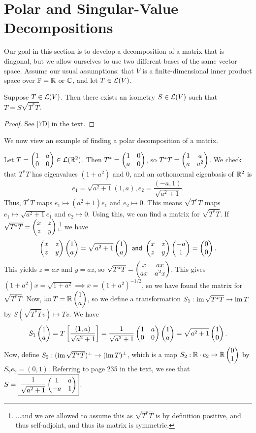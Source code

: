 \documentclass{article}
\newcommand{\vect}[2]{\begin{pmatrix} #1 \\ #2\end{pmatrix}}
\begin{document}
\section{Polar and Singular-Value Decompositions}
Our goal in this section is to develop a decomposition of a matrix that is diagonal, but we allow ourselves to use two different bases of the same vector space. Assume our usual assumptions: that $V$ is a finite-dimensional inner product space over $\mathbb F = \mathbb R$ or $\mathbb C$, and let $T\in\mathcal L(V)$.
\begin{theorem}
Suppose $T\in\mathcal L(V)$. Then there exists an isometry $S\in\mathcal L(V)$ such that $T = S\sqrt{T^*T}$.
\end{theorem}
\begin{proof}
See [7D] in the text.
\end{proof}
We now view an example of finding a polar decomposition of a matrix. \newpage
\begin{example}
Let $T = \begin{pmatrix}1 & a \\ 0 & 0 \end{pmatrix} \in \mathcal L(\mathbb R^2)$. Then $T^* = \begin{pmatrix}1 & 0 \\ a & 0 \end{pmatrix}$, so $T^*T = \begin{pmatrix}1 & a \\ a & a^2 \end{pmatrix}$. We check that $T^*T$ has eigenvalues $(1+a^2)$ and $0$, and an orthonormal eigenbasis of $\mathbb R^2$ is
$$e_1 = \sqrt{a^2+1}(1, a), e_2 = \frac{(-a, 1)}{\sqrt{a^2+1}}.$$
Thus, $T^*T$ maps $e_1 \mapsto (a^2+1)e_1$ and $e_2 \mapsto 0$. This means $\sqrt{T^*T}$ maps $e_1 \mapsto \sqrt{a^2+1}e_1$ and $e_2\mapsto 0$. Using this, we can find a matrix for $\sqrt{T^*T}$. If $\sqrt{T^*T} = \begin{pmatrix}x & z \\ z & y \end{pmatrix}$,\footnote{...and we are allowed to assume this as $\sqrt{T^*T}$ is by definition positive, and thus self-adjoint, and thus its matrix is symmetric.} we have
$$\matfour xzzy\vect 1a = \sqrt{a^2+1}\vect 1a \textsf{ and } \matfour xzzy\vect {-a}1 = \vect 00.$$
This yields $z=ax$ and $y=az$, so $\sqrt{T^*T} = \begin{pmatrix}x & ax \\ ax & a^2x \end{pmatrix}$. This gives $(1+a^2)x = \sqrt{1+a^2} \implies x = (1+a^2)^{-1/2}$, so we have found the matrix for $\sqrt{T^*T}$. Now, $\im T = \R\vect 1a$, so we define a transformation $S_1: \operatorname{im} \sqrt{T^*T} \to \operatorname{im} T$ by $S(\sqrt{T^*T}v) \mapsto Tv$. We have
$$S_1\vect 1a = T\brak{\frac{(1,a)}{\sqrt{a^2+1}}} = \frac 1{\sqrt{a^2+1}}\matfour 1a00 \vect 1a = \sqrt{a^2+1}\vect 10.$$
Now, define $S_2: (\operatorname{im}\sqrt{T^*T})^\perp \to (\operatorname{im} T)^\perp$, which is a map $S_2: \R\cdot e_2 \to \R\vect 01$ by $S_2e_2 = (0,1)$. Referring to page 235 in the text, we see that $S = \boxed{\frac 1{\sqrt{a^2+1}}\begin{pmatrix}1 & a \\ -a & 1 \end{pmatrix}}$.
\end{example}
\end{document}
